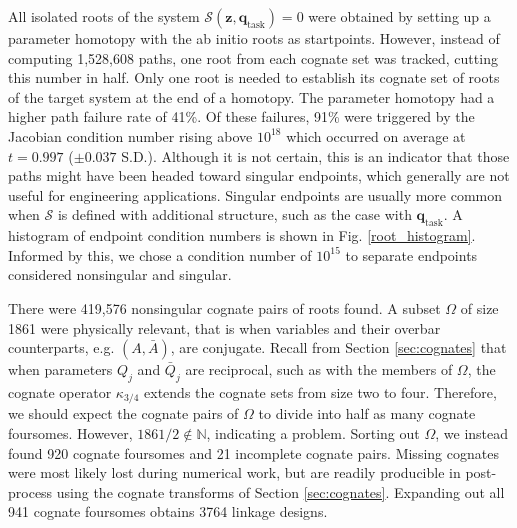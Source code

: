 \documentclass[journal]{IEEEtran}
\def\*#1{\bar{#1}} %
\begin{document}
All isolated roots of the system $\mathcal{S}(\mathbf{z},\mathbf{q}_\text{task})=0$ were obtained by setting up a parameter homotopy with the ab initio roots as startpoints.
However, instead of computing 1,528,608 paths, one root from each cognate set was tracked, cutting this number in half.
Only one root is needed to establish its cognate set of roots of the target system at the end of a homotopy.
The parameter homotopy had a higher path failure rate of 41\%.  Of these failures, 91\% were triggered by the Jacobian condition number rising above $10^{18}$ which occurred on average at $t=0.997$ ($\pm 0.037$ S.D.).
Although it is not certain, this is an indicator that those paths might have been headed toward singular endpoints, which generally are not useful for engineering applications.
Singular endpoints are usually more common when $\mathcal{S}$ is defined with additional structure, such as the case with $\mathbf{q}_\text{task}$.
A histogram of endpoint condition numbers is shown in Fig. \ref{root_histogram}.  Informed by this, we chose a condition number of $10^{15}$ to separate endpoints considered nonsingular and singular.




There were 419,576 nonsingular cognate pairs of roots found.
A subset $\Omega$ of size 1861 were physically relevant, that is when variables and their overbar counterparts, e.g. $(A,\*A)$, are conjugate.
Recall from Section \ref{sec:cognates} that when parameters $Q_j$ and $\*Q_j$ are reciprocal, such as with the members of $\Omega$, the cognate operator $\kappa_{3/4}$ extends the cognate sets from size two to four.
Therefore, we should expect the cognate pairs of $\Omega$ to divide into half as many cognate foursomes.
However, $1861/2\notin\mathbb{N}$, indicating a problem.
Sorting out $\Omega$, we instead found 920 cognate foursomes and 21 incomplete cognate pairs.
Missing cognates were most likely lost during numerical work, but are readily producible in post-process using the cognate transforms of Section \ref{sec:cognates}.
Expanding out all 941 cognate foursomes obtains 3764 linkage designs.
\end{document}
